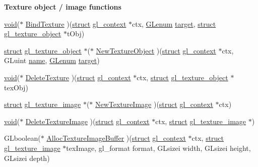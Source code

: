 \begin{Indent}\textbf{ Texture object / image functions}\par
\begin{DoxyCompactItemize}
\item 
\hyperlink{interfacevoid}{void}($\ast$ \hyperlink{structdd__function__table_adb02edc9fb93a4b96cfc999355ec5be7}{Bind\+Texture} )(\hyperlink{interfacestruct}{struct} \hyperlink{structgl__context}{gl\+\_\+context} $\ast$ctx, \hyperlink{interfacevoid}{G\+Lenum} \hyperlink{interfacevoid}{target}, \hyperlink{interfacestruct}{struct} \hyperlink{structgl__texture__object}{gl\+\_\+texture\+\_\+object} $\ast$t\+Obj)
\item 
\hyperlink{interfacestruct}{struct} \hyperlink{structgl__texture__object}{gl\+\_\+texture\+\_\+object} $\ast$($\ast$ \hyperlink{structdd__function__table_a80f07e92761e4295e1d99111bd149d8a}{New\+Texture\+Object} )(\hyperlink{interfacestruct}{struct} \hyperlink{structgl__context}{gl\+\_\+context} $\ast$ctx, G\+Luint \hyperlink{structname}{name}, \hyperlink{interfacevoid}{G\+Lenum} \hyperlink{interfacevoid}{target})
\item 
\hyperlink{interfacevoid}{void}($\ast$ \hyperlink{structdd__function__table_abdddd372703dc0ab4786e62e73c879a9}{Delete\+Texture} )(\hyperlink{interfacestruct}{struct} \hyperlink{structgl__context}{gl\+\_\+context} $\ast$ctx, \hyperlink{interfacestruct}{struct} \hyperlink{structgl__texture__object}{gl\+\_\+texture\+\_\+object} $\ast$tex\+Obj)
\item 
\hyperlink{interfacestruct}{struct} \hyperlink{structgl__texture__image}{gl\+\_\+texture\+\_\+image} $\ast$($\ast$ \hyperlink{structdd__function__table_af908ae93c473fd237a2d9b98245d2006}{New\+Texture\+Image} )(\hyperlink{interfacestruct}{struct} \hyperlink{structgl__context}{gl\+\_\+context} $\ast$ctx)
\item 
\hyperlink{interfacevoid}{void}($\ast$ \hyperlink{structdd__function__table_a7b924d27d8e7c19e5aa91c466705a569}{Delete\+Texture\+Image} )(\hyperlink{interfacestruct}{struct} \hyperlink{structgl__context}{gl\+\_\+context} $\ast$ctx, \hyperlink{interfacestruct}{struct} \hyperlink{structgl__texture__image}{gl\+\_\+texture\+\_\+image} $\ast$)
\item 
G\+Lboolean($\ast$ \hyperlink{structdd__function__table_a0cf36e5c6722b5cf92a942b490afe9c7}{Alloc\+Texture\+Image\+Buffer} )(\hyperlink{interfacestruct}{struct} \hyperlink{structgl__context}{gl\+\_\+context} $\ast$ctx, \hyperlink{interfacestruct}{struct} \hyperlink{structgl__texture__image}{gl\+\_\+texture\+\_\+image} $\ast$tex\+Image, gl\+\_\+format format, G\+Lsizei width, G\+Lsizei height, G\+Lsizei depth)

\end{DoxyCompactItemize}
\end{Indent}
